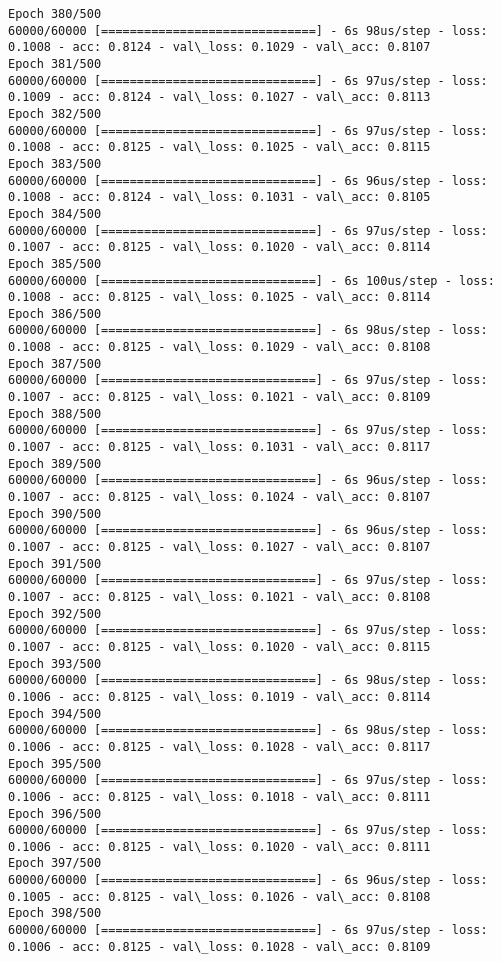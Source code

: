\documentclass[11pt]{article}
\begin{document}
\begin{Verbatim}[commandchars=\\\{\}]
Epoch 380/500
60000/60000 [==============================] - 6s 98us/step - loss: 0.1008 - acc: 0.8124 - val\_loss: 0.1029 - val\_acc: 0.8107
Epoch 381/500
60000/60000 [==============================] - 6s 97us/step - loss: 0.1009 - acc: 0.8124 - val\_loss: 0.1027 - val\_acc: 0.8113
Epoch 382/500
60000/60000 [==============================] - 6s 97us/step - loss: 0.1008 - acc: 0.8125 - val\_loss: 0.1025 - val\_acc: 0.8115
Epoch 383/500
60000/60000 [==============================] - 6s 96us/step - loss: 0.1008 - acc: 0.8124 - val\_loss: 0.1031 - val\_acc: 0.8105
Epoch 384/500
60000/60000 [==============================] - 6s 97us/step - loss: 0.1007 - acc: 0.8125 - val\_loss: 0.1020 - val\_acc: 0.8114
Epoch 385/500
60000/60000 [==============================] - 6s 100us/step - loss: 0.1008 - acc: 0.8125 - val\_loss: 0.1025 - val\_acc: 0.8114
Epoch 386/500
60000/60000 [==============================] - 6s 98us/step - loss: 0.1008 - acc: 0.8125 - val\_loss: 0.1029 - val\_acc: 0.8108
Epoch 387/500
60000/60000 [==============================] - 6s 97us/step - loss: 0.1007 - acc: 0.8125 - val\_loss: 0.1021 - val\_acc: 0.8109
Epoch 388/500
60000/60000 [==============================] - 6s 97us/step - loss: 0.1007 - acc: 0.8125 - val\_loss: 0.1031 - val\_acc: 0.8117
Epoch 389/500
60000/60000 [==============================] - 6s 96us/step - loss: 0.1007 - acc: 0.8125 - val\_loss: 0.1024 - val\_acc: 0.8107
Epoch 390/500
60000/60000 [==============================] - 6s 96us/step - loss: 0.1007 - acc: 0.8125 - val\_loss: 0.1027 - val\_acc: 0.8107
Epoch 391/500
60000/60000 [==============================] - 6s 97us/step - loss: 0.1007 - acc: 0.8125 - val\_loss: 0.1021 - val\_acc: 0.8108
Epoch 392/500
60000/60000 [==============================] - 6s 97us/step - loss: 0.1007 - acc: 0.8125 - val\_loss: 0.1020 - val\_acc: 0.8115
Epoch 393/500
60000/60000 [==============================] - 6s 98us/step - loss: 0.1006 - acc: 0.8125 - val\_loss: 0.1019 - val\_acc: 0.8114
Epoch 394/500
60000/60000 [==============================] - 6s 98us/step - loss: 0.1006 - acc: 0.8125 - val\_loss: 0.1028 - val\_acc: 0.8117
Epoch 395/500
60000/60000 [==============================] - 6s 97us/step - loss: 0.1006 - acc: 0.8125 - val\_loss: 0.1018 - val\_acc: 0.8111
Epoch 396/500
60000/60000 [==============================] - 6s 97us/step - loss: 0.1006 - acc: 0.8125 - val\_loss: 0.1020 - val\_acc: 0.8111
Epoch 397/500
60000/60000 [==============================] - 6s 96us/step - loss: 0.1005 - acc: 0.8125 - val\_loss: 0.1026 - val\_acc: 0.8108
Epoch 398/500
60000/60000 [==============================] - 6s 97us/step - loss: 0.1006 - acc: 0.8125 - val\_loss: 0.1028 - val\_acc: 0.8109

\end{Verbatim}
\end{document}
